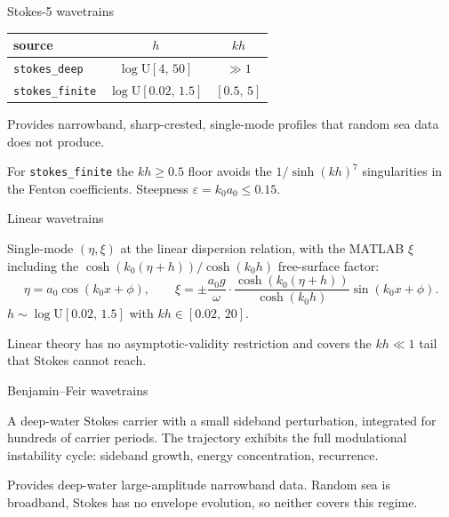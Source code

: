 \documentclass[aspectratio=169,11pt]{beamer}
\begin{document}
\begin{frame}{Stokes-5 wavetrains}

\begin{center}\small
\begin{tabular}{lcc}
\toprule
source & $h$ & $kh$ \\
\midrule
\texttt{stokes\_deep}     & $\log\mathrm{U}[4,\,50]$    & $\gg 1$ \\
\texttt{stokes\_finite}   & $\log\mathrm{U}[0.02,\,1.5]$ & $[0.5,\,5]$ \\
\bottomrule
\end{tabular}
\end{center}

\pause
Provides narrowband, sharp-crested, single-mode profiles that random sea
data does not produce.

\pause
\small{For \texttt{stokes\_finite} the $kh \geq 0.5$ floor avoids the
$1/\sinh(kh)^7$ singularities in the Fenton coefficients. Steepness
$\varepsilon = k_0 a_0 \le 0.15$.}
\end{frame}

\begin{frame}{Linear wavetrains}

Single-mode $(\eta,\xi)$ at the linear dispersion relation, with the MATLAB
$\xi$ including the $\cosh(k_0(\eta + h))/\cosh(k_0 h)$ free-surface factor:
\[
  \eta = a_0 \cos(k_0 x + \phi), \qquad
  \xi  = \pm \frac{a_0 g}{\omega} \cdot \frac{\cosh(k_0(\eta+h))}{\cosh(k_0 h)} \sin(k_0 x + \phi).
\]
$h \sim \log\mathrm{U}[0.02,\,1.5]$ with $kh \in [0.02,\,20]$.

\pause
Linear theory has no asymptotic-validity restriction and covers the
$kh \ll 1$ tail that Stokes cannot reach.
\end{frame}

\begin{frame}{Benjamin--Feir wavetrains}

A deep-water Stokes carrier with a small sideband perturbation, integrated
for hundreds of carrier periods. The trajectory exhibits the full modulational
instability cycle: sideband growth, energy concentration, recurrence.

\pause
Provides deep-water large-amplitude narrowband data. Random sea is broadband,
Stokes has no envelope evolution, so neither covers this regime.
\end{frame}
\end{document}
